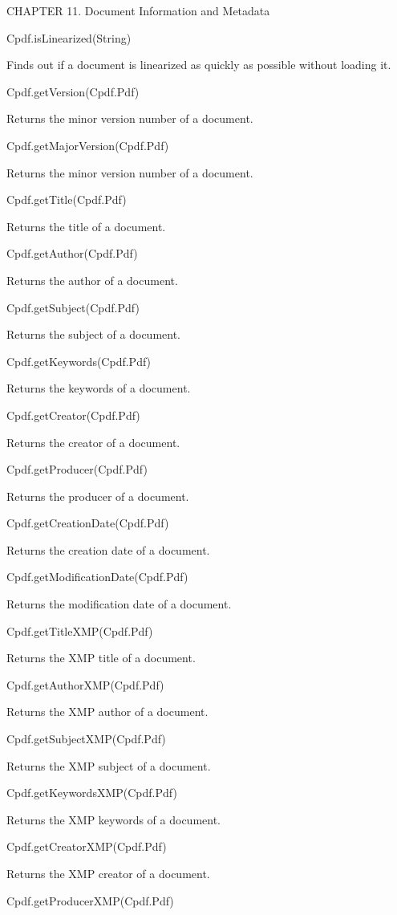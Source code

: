 CHAPTER 11. Document Information and Metadata

Cpdf.isLinearized(String)


Finds out if a document is linearized as
quickly as possible without loading it.


Cpdf.getVersion(Cpdf.Pdf)


Returns the minor version number of a document.


Cpdf.getMajorVersion(Cpdf.Pdf)


Returns the minor version number of a document.


Cpdf.getTitle(Cpdf.Pdf)


Returns the title of a document.


Cpdf.getAuthor(Cpdf.Pdf)


Returns the author of a document.


Cpdf.getSubject(Cpdf.Pdf)


Returns the subject of a document.


Cpdf.getKeywords(Cpdf.Pdf)


Returns the keywords of a document.


Cpdf.getCreator(Cpdf.Pdf)


Returns the creator of a document.


Cpdf.getProducer(Cpdf.Pdf)


Returns the producer of a document.


Cpdf.getCreationDate(Cpdf.Pdf)


Returns the creation date of a document.


Cpdf.getModificationDate(Cpdf.Pdf)


Returns the modification date of a document.


Cpdf.getTitleXMP(Cpdf.Pdf)


Returns the XMP title of a document.


Cpdf.getAuthorXMP(Cpdf.Pdf)


Returns the XMP author of a document.


Cpdf.getSubjectXMP(Cpdf.Pdf)


Returns the XMP subject of a document.


Cpdf.getKeywordsXMP(Cpdf.Pdf)


Returns the XMP keywords of a document.


Cpdf.getCreatorXMP(Cpdf.Pdf)


Returns the XMP creator of a document.


Cpdf.getProducerXMP(Cpdf.Pdf)


